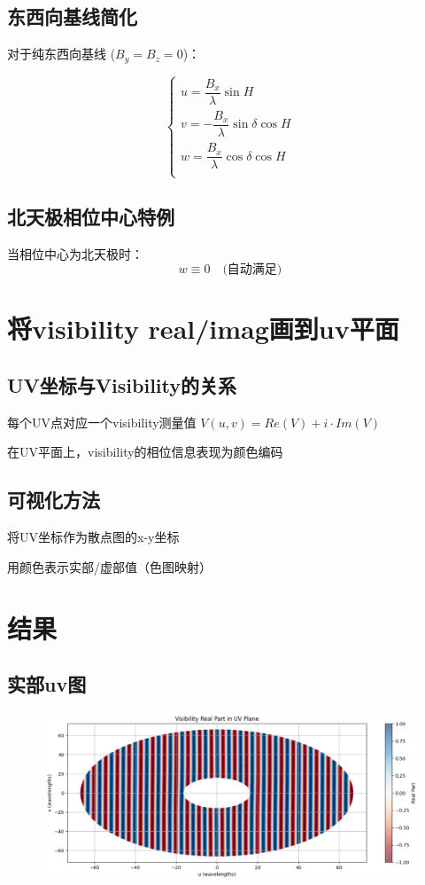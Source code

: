 \documentclass{article}
\begin{document}
\subsection{东西向基线简化}
对于纯东西向基线 ($B_y = B_z = 0$)：

\begin{equation}
\begin{cases}
u = \dfrac{B_x}{\lambda} \sin H \\
v = -\dfrac{B_x}{\lambda} \sin \delta \cos H \\
w = \dfrac{B_x}{\lambda} \cos \delta \cos H \\
\end{cases}
\end{equation}

\subsection{北天极相位中心特例}
当相位中心为北天极时：
\begin{equation}
w \equiv 0 \quad \text{(自动满足)}
\end{equation}

\section{将visibility real/imag画到uv平面}
\subsection{UV坐标与Visibility的关系}
每个UV点对应一个visibility测量值 $V(u,v)=Re(V)+i \cdot Im(V)$

在UV平面上，visibility的相位信息表现为颜色编码
\subsection{可视化方法}
将UV坐标作为散点图的x-y坐标

用颜色表示实部/虚部值（色图映射）

\section{结果}
\subsection{实部uv图}
    \begin{figure}[htp]
    \centering
    \includegraphics[width=1\textwidth]{task3/real.png}
    \label{fig:real}
    \end{figure}
\end{document}
